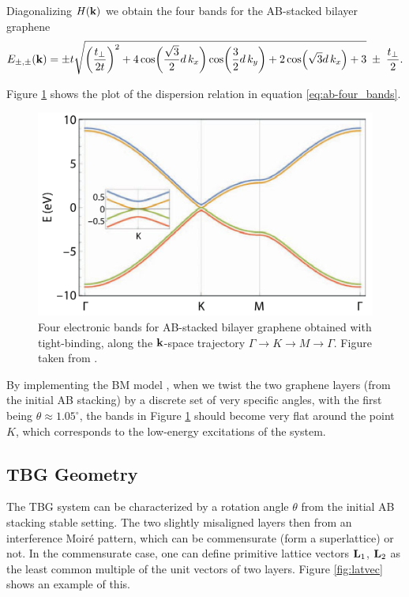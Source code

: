 \documentclass[12pt]{report}
\begin{document}
Diagonalizing $H({\vb{k}})$ we obtain the four bands for the AB-stacked bilayer graphene
\begin{equation} \label{eq:ab-four_bands}
E_{\pm,\pm}({\vb{k}}) = \pm t
\sqrt{
\qty(\frac{t_\perp}{2t})^2 +
4 \cos(\frac{\sqrt{3}}{2} d \, k_x) \cos(\frac{3}{2} d \, k_y) + 2 \cos(\sqrt{3} d \, k_x) + 3
}
\; \pm \; \frac{t_\perp}{2}.
\end{equation}

Figure \ref{fig:ab-4bands} shows the plot of the dispersion relation in equation \ref{eq:ab-four_bands}.

\begin{figure}[H]
\centering
\includegraphics[width=0.6\linewidth]{fig/tbg/ab-4bands.png}
\caption{Four electronic bands for AB-stacked bilayer graphene obtained with tight-binding, along the ${\vb{k}}$-space trajectory $\Gamma \to K \to M \to \Gamma$. Figure taken from \cite{handbook2019}.}
\label{fig:ab-4bands}
\end{figure}

By implementing the BM model \cite{macdonald2011}, when we twist the two graphene layers (from the initial AB stacking) by a discrete set of very specific angles, with the first being $\theta \approx 1.05^\circ$, the bands in Figure \ref{fig:ab-4bands} should become very flat around the point $K$, which corresponds to the low-energy excitations of the system.


\subsection{TBG Geometry} \label{sec:tbg_geom}

The TBG system can be characterized by a rotation angle $\theta$ from the initial AB stacking stable setting. The two slightly misaligned layers then from an interference Moiré pattern, which can be commensurate (form a superlattice) or not. In the commensurate case, one can define primitive lattice vectors $\vb{L}_1$, $\vb{L}_2$ as the least common multiple of the unit vectors of two layers. Figure \ref{fig:latvec} shows an example of this.
\end{document}
